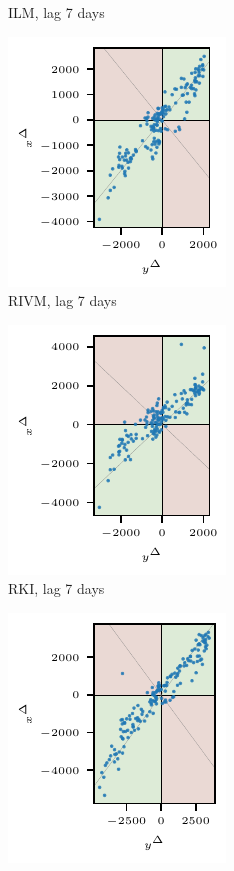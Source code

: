 \begin{figure}
\begin{subfigure}[t]{0.23\textwidth}
    \caption{ILM, lag 7 days}\label{fig:app-covid-4q-ilm-7}
\end{subfigure}\hspace{0.01\textwidth}%
\begin{subfigure}[t]{0.23\textwidth}
    \includegraphics{plots/covid_nowcast/30_RIVM_4q_lag_7}
    \caption{RIVM, lag 7 days}\label{fig:app-covid-4q-rivm-7}
\end{subfigure}\hspace{0.01\textwidth}%
\begin{subfigure}[t]{0.23\textwidth}
    \includegraphics{plots/covid_nowcast/30_RKI_4q_lag_7}
    \caption{RKI, lag 7 days}\label{fig:app-covid-4q-rki-7}
\end{subfigure}
\begin{subfigure}[t]{0.23\textwidth}%
    \includegraphics{plots/covid_nowcast/30_ENS-MEAN_4q_lag_14}

\end{subfigure}
\end{figure}
